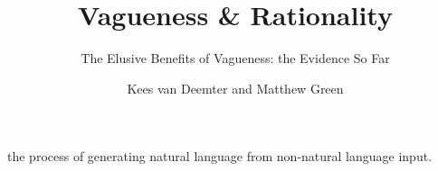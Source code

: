 \documentclass[graybox,envcountchap,sectrefs%
,footinfo
]{svmono}
\begin{document}
\author{Kees van Deemter and Matthew Green}
\title{Vagueness \& Rationality}
\subtitle{The Elusive Benefits of Vagueness: the Evidence So Far}
\maketitle

\frontmatter
\tableofcontents





\backmatter
{}

 the process of generating natural language from non-natural language input.

\printindex
\end{document}
